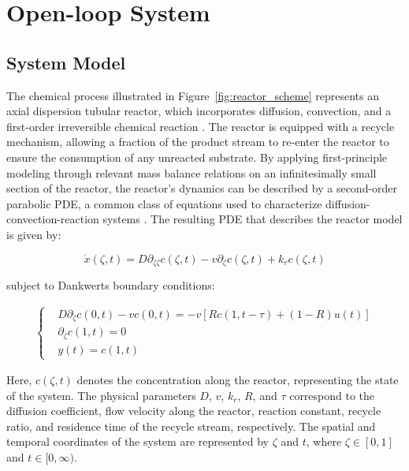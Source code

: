 \newpage
\section{Open-loop System}

\subsection{System Model}

The chemical process illustrated in Figure~\ref{fig:reactor_scheme} represents an axial dispersion tubular reactor, which incorporates diffusion, convection, and a first-order irreversible chemical reaction \autocite{levenspiel1998chemical}. The reactor is equipped with a recycle mechanism, allowing a fraction of the product stream to re-enter the reactor to ensure the consumption of any unreacted substrate. By applying first-principle modeling through relevant mass balance relations on an infinitesimally small section of the reactor, the reactor's dynamics can be described by a second-order parabolic PDE, a common class of equations used to characterize diffusion-convection-reaction systems \autocite{jensen1982bifurcation}. The resulting PDE that describes the reactor model is given by:

\begin{equation} \label{eq:PDE_original_model}
    \dot{x}(\zeta, t) = D \partial_{\zeta \zeta} c(\zeta, t) - v \partial_\zeta c(\zeta, t) + k_r c(\zeta, t)
\end{equation}

subject to Dankwerts boundary conditions:

\begin{align} \label{eq:BC}
    \begin{cases}
        &D \partial_\zeta c(0, t) - v c(0, t) = -v \left[ R c(1, t-\tau) + (1-R) u(t) \right] \\
        &\partial_\zeta c(1, t) = 0 \\
        &y(t) = c(1, t)
    \end{cases}
\end{align}

Here, $c(\zeta, t)$ denotes the concentration along the reactor, representing the state of the system. The physical parameters $D$, $v$, $k_r$, $R$, and $\tau$ correspond to the diffusion coefficient, flow velocity along the reactor, reaction constant, recycle ratio, and residence time of the recycle stream, respectively. The spatial and temporal coordinates of the system are represented by $\zeta$ and $t$, where $\zeta \in [0, 1]$ and $t \in [0, \infty)$.

